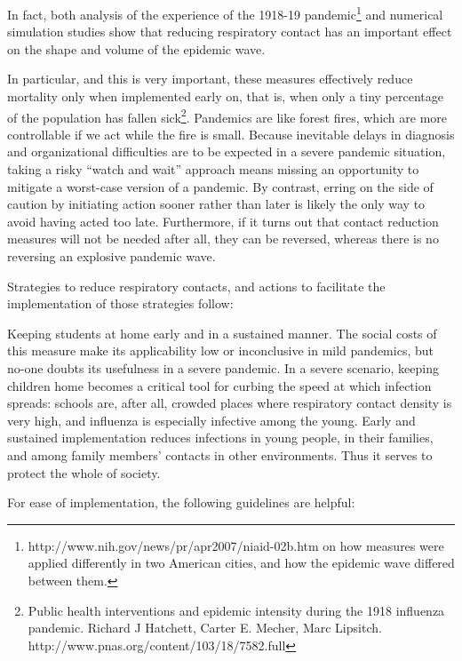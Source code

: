 \documentclass[12pt, a4]{scrartcl}
\begin{document}
In fact, both analysis of the experience of the 1918-19 pandemic\footnote{ http://www.nih.gov/news/pr/apr2007/niaid-02b.htm on how measures were applied differently in two American cities, and how the epidemic wave differed between them.} and numerical simulation studies show that reducing respiratory contact has an important effect on the shape and volume of the epidemic wave.

In particular, and this is very important, these measures effectively reduce mortality only when implemented early on, that is, when only a tiny percentage of the population has fallen sick\footnote{Public health interventions and epidemic intensity during the 1918 influenza pandemic. Richard J Hatchett, Carter E. Mecher, Marc Lipsitch. http://www.pnas.org/content/103/18/7582.full}. Pandemics are like forest fires, which are more controllable if we act while the fire is small. Because inevitable delays in diagnosis and organizational difficulties are to be expected in a severe pandemic situation, taking a risky “watch and wait” approach means missing an opportunity to mitigate a worst-case version of a pandemic. By contrast, erring on the side of caution by initiating action sooner rather than later is likely the only way to avoid having acted too late. Furthermore, if it turns out that contact reduction measures will not be needed after all, they can be reversed, whereas there is no reversing an explosive pandemic wave. 

Strategies to reduce respiratory contacts, and actions to facilitate the implementation of those strategies follow:

Keeping students at home early and in a sustained manner. The social costs of this measure make its applicability low or inconclusive in mild pandemics, but no-one doubts its usefulness in a severe pandemic. In a severe scenario, keeping children home becomes a critical tool for curbing the speed at which infection spreads: schools are, after all, crowded places where respiratory contact density is very high, and influenza is especially infective among the young. Early and sustained implementation reduces infections in young people, in their families, and among family members' contacts in other environments. Thus it serves to protect the whole of society.

For ease of implementation, the following guidelines are helpful:
\end{document}
